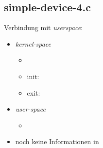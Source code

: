 \subsection{simple-device-4.c}
\begin{frame}{}{Verbindung mit {\em userspace}: }
\begin{itemize}
 \item {\em kernel-space}
 \begin{itemize}
  \item {}
  \item init: 
  \item exit: 
 \end{itemize}
 \item {\em user-space}
 \begin{itemize}
  \item {}
 \end{itemize}
 \item noch keine Informationen in 
\end{itemize}
\end{frame}

